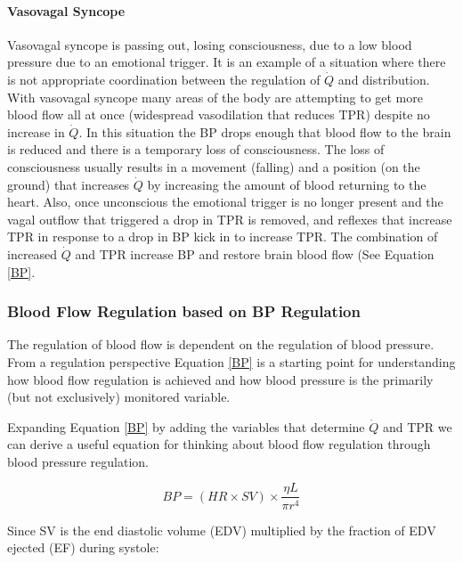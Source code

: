 \paragraph{Vasovagal Syncope}
Vasovagal syncope is passing out, losing consciousness, due to a low blood pressure due to an emotional trigger. It is an example of a situation where there is not appropriate coordination between the regulation of $\dot{Q}$ and distribution. With vasovagal syncope many areas of the body are attempting to get more blood flow all at once (widespread vasodilation that reduces TPR) despite no increase in $\dot{Q}$. In this situation the BP drops enough that blood flow to the brain is reduced and there is a temporary loss of consciousness. The loss of consciousness usually results in a movement (falling) and a position (on the ground) that increases $\dot{Q}$ by increasing the amount of blood returning to the heart. Also, once unconscious the emotional trigger is no longer present and the vagal outflow that triggered a drop in TPR is removed, and reflexes that increase TPR in response to a drop in BP kick in to increase TPR. The combination of increased $\dot{Q}$ and TPR increase BP and restore brain blood flow (See Equation \ref{BP}.

\subsubsection{Blood Flow Regulation based on BP Regulation}

The regulation of blood flow is dependent on the regulation of blood pressure. From a regulation perspective Equation \ref{BP} is a starting point for understanding how blood flow regulation is achieved and how blood pressure is the primarily (but not exclusively\footnotemark{}) monitored variable.

Expanding Equation \ref{BP} by adding the variables that determine $\dot{Q}$ and TPR we can derive a useful equation for thinking about blood flow regulation through blood pressure regulation.

\begin{equation}
    BP = (HR \times SV) \times \frac{\eta L}{\pi r^4}
\end{equation}

Since SV is the end diastolic volume (EDV) multiplied by the fraction of EDV ejected (EF) during systole:

